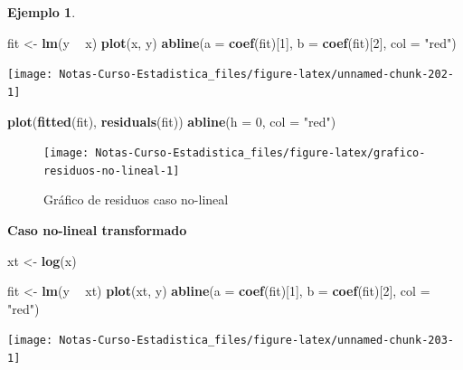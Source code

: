 \documentclass[
  12pt,
]{book}
\newenvironment{Shaded}{\begin{snugshade}}{\end{snugshade}}
\newcommand{\DataTypeTok}[1]{\textcolor[rgb]{0.13,0.29,0.53}{#1}}
\newcommand{\DecValTok}[1]{\textcolor[rgb]{0.00,0.00,0.81}{#1}}
\newcommand{\KeywordTok}[1]{\textcolor[rgb]{0.13,0.29,0.53}{\textbf{#1}}}
\newcommand{\NormalTok}[1]{#1}
\newcommand{\OperatorTok}[1]{\textcolor[rgb]{0.81,0.36,0.00}{\textbf{#1}}}
\newcommand{\StringTok}[1]{\textcolor[rgb]{0.31,0.60,0.02}{#1}}
\theoremstyle{definition}
\theoremstyle{definition}
\newtheorem{example}{Ejemplo}[chapter]
\theoremstyle{definition}
\theoremstyle{remark}
\begin{document}
\begin{example}
\begin{Shaded}
\begin{Highlighting}[]
\NormalTok{fit <-}\StringTok{ }\KeywordTok{lm}\NormalTok{(y }\OperatorTok{~}\StringTok{ }\NormalTok{x)}
\KeywordTok{plot}\NormalTok{(x, y)}
\KeywordTok{abline}\NormalTok{(}\DataTypeTok{a =} \KeywordTok{coef}\NormalTok{(fit)[}\DecValTok{1}\NormalTok{], }\DataTypeTok{b =} \KeywordTok{coef}\NormalTok{(fit)[}\DecValTok{2}\NormalTok{], }\DataTypeTok{col =} \StringTok{"red"}\NormalTok{)}
\end{Highlighting}
\end{Shaded}

\begin{center}\texttt{[image: Notas-Curso-Estadistica\_files/figure-latex/unnamed-chunk-202-1]} \end{center}

\begin{Shaded}
\begin{Highlighting}[]
\KeywordTok{plot}\NormalTok{(}\KeywordTok{fitted}\NormalTok{(fit), }\KeywordTok{residuals}\NormalTok{(fit))}
\KeywordTok{abline}\NormalTok{(}\DataTypeTok{h =} \DecValTok{0}\NormalTok{, }\DataTypeTok{col =} \StringTok{"red"}\NormalTok{)}
\end{Highlighting}
\end{Shaded}

\begin{figure}

{\centering \texttt{[image: Notas-Curso-Estadistica\_files/figure-latex/grafico-residuos-no-lineal-1]} 

}

\caption{Gráfico de residuos caso no-lineal}\label{fig:grafico-residuos-no-lineal}
\end{figure}

\textbf{Caso no-lineal transformado}

\begin{Shaded}
\begin{Highlighting}[]
\NormalTok{xt <-}\StringTok{ }\KeywordTok{log}\NormalTok{(x)}


\NormalTok{fit <-}\StringTok{ }\KeywordTok{lm}\NormalTok{(y }\OperatorTok{~}\StringTok{ }\NormalTok{xt)}
\KeywordTok{plot}\NormalTok{(xt, y)}
\KeywordTok{abline}\NormalTok{(}\DataTypeTok{a =} \KeywordTok{coef}\NormalTok{(fit)[}\DecValTok{1}\NormalTok{], }\DataTypeTok{b =} \KeywordTok{coef}\NormalTok{(fit)[}\DecValTok{2}\NormalTok{], }\DataTypeTok{col =} \StringTok{"red"}\NormalTok{)}
\end{Highlighting}
\end{Shaded}

\begin{center}\texttt{[image: Notas-Curso-Estadistica\_files/figure-latex/unnamed-chunk-203-1]} \end{center}


\end{example}
\end{document}
